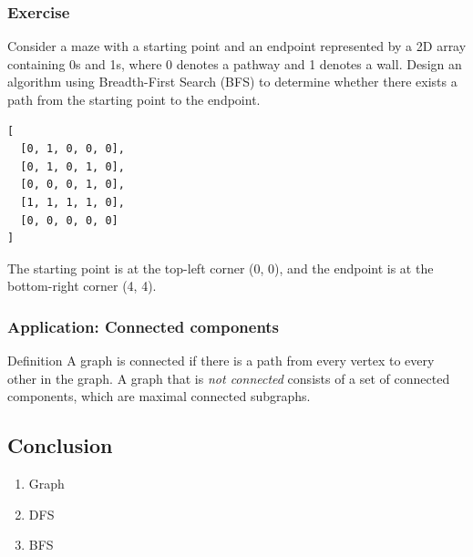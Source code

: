 \documentclass[aspectratio=169, 14pt]{beamer}
\begin{document}
\begin{frame}[fragile]
	\frametitle{Exercise}
	Consider a maze with a starting point and an endpoint represented by a 2D array containing 0s and 1s, where 0 denotes a pathway and 1 denotes a wall. Design an algorithm using Breadth-First Search (BFS) to determine whether there exists a path from the starting point to the endpoint.


\end{frame}

\begin{frame}[fragile]

	\begin{verbatim}
[
  [0, 1, 0, 0, 0],
  [0, 1, 0, 1, 0],
  [0, 0, 0, 1, 0],
  [1, 1, 1, 1, 0],
  [0, 0, 0, 0, 0]
]
  \end{verbatim}

	The starting point is at the top-left corner (0, 0), and the endpoint is at the bottom-right corner (4, 4).
\end{frame}

\begin{frame}[fragile]
	\frametitle{Application: Connected components}
	\begin{block}{Definition}
		A graph is \alert{connected} if there is a path from every vertex to every other in the graph. A graph that is \emph{not connected} consists of a set of \alert{connected components}, which are maximal connected subgraphs.
	\end{block}

\end{frame}


\begin{frame}

	\section{\textcolor{darkmidnightblue}{Conclusion}}
	\begin{enumerate}
		\item Graph
		\item DFS
		\item BFS
	\end{enumerate}
\end{frame}
\end{document}
